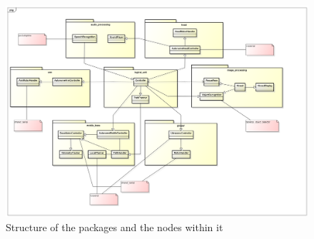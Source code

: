 \documentclass[technical_document.tex]{subfiles}
\begin{document}
\begin{figure}[ht!]
	\centering
	\mbox{\includegraphics[scale=0.3]{Images/Nodes.png}}
	\caption{Structure of the packages and the nodes within it}
	\label{fig:nodes}
\end{figure}
\end{document}
